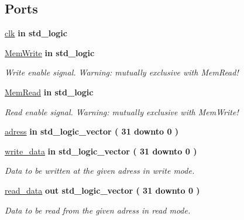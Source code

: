\subsection*{\-Ports}
 \begin{DoxyCompactItemize}
\item 
\hypertarget{classdata__memory_a78bd51cc257fe0e8fa69227fc1865a8e}{\hyperlink{classdata__memory_a78bd51cc257fe0e8fa69227fc1865a8e}{clk}  {\bfseries {\bfseries in }} {\bfseries std\-\_\-logic } }\label{classdata__memory_a78bd51cc257fe0e8fa69227fc1865a8e}

\item 
\hypertarget{classdata__memory_a20b873e427ea4a28cb74ec7d495730d8}{\hyperlink{classdata__memory_a20b873e427ea4a28cb74ec7d495730d8}{\-Mem\-Write}  {\bfseries {\bfseries in }} {\bfseries std\-\_\-logic } }\label{classdata__memory_a20b873e427ea4a28cb74ec7d495730d8}

\begin{DoxyCompactList}\small\item\em \-Write enable signal. \-Warning\-: mutually exclusive with \-Mem\-Read! \end{DoxyCompactList}\item 
\hypertarget{classdata__memory_a24c8cc235a5d3a2ce36383b15a577f8e}{\hyperlink{classdata__memory_a24c8cc235a5d3a2ce36383b15a577f8e}{\-Mem\-Read}  {\bfseries {\bfseries in }} {\bfseries std\-\_\-logic } }\label{classdata__memory_a24c8cc235a5d3a2ce36383b15a577f8e}

\begin{DoxyCompactList}\small\item\em \-Read enable signal. \-Warning\-: mutually exclusive with \-Mem\-Write! \end{DoxyCompactList}\item 
\hyperlink{classdata__memory_a2defa08e23fedc6207b33f767eada3aa}{adress}  {\bfseries {\bfseries in }} {\bfseries std\-\_\-logic\-\_\-vector (   31    downto    0  ) } 
\item 
\hypertarget{classdata__memory_a51f56919bb46d2865cf22fe28742660b}{\hyperlink{classdata__memory_a51f56919bb46d2865cf22fe28742660b}{write\-\_\-data}  {\bfseries {\bfseries in }} {\bfseries std\-\_\-logic\-\_\-vector (   31    downto    0  ) } }\label{classdata__memory_a51f56919bb46d2865cf22fe28742660b}

\begin{DoxyCompactList}\small\item\em \-Data to be written at the given adress in write mode. \end{DoxyCompactList}\item 
\hypertarget{classdata__memory_a4cbcac52c2e90b6e7e111be703b6afdb}{\hyperlink{classdata__memory_a4cbcac52c2e90b6e7e111be703b6afdb}{read\-\_\-data}  {\bfseries {\bfseries out }} {\bfseries std\-\_\-logic\-\_\-vector (   31    downto    0  ) } }\label{classdata__memory_a4cbcac52c2e90b6e7e111be703b6afdb}

\begin{DoxyCompactList}\small\item\em \-Data to be read from the given adress in read mode. \end{DoxyCompactList}\end{DoxyCompactItemize}


